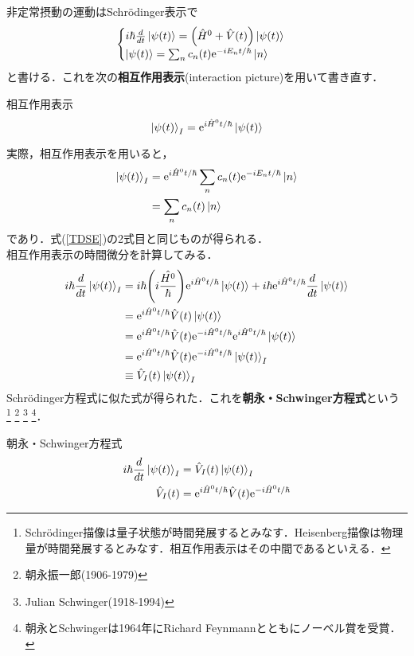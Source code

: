 \documentclass{report}
\begin{document}
  非定常摂動の運動はSchrödinger表示で
  \begin{equation}
    \label{TDSE}
    \begin{cases}
    i\hbar\frac{d}{dt}\ket{\psi(t)}=\qty(\hat{H}^0+\hat{V}(t))\ket{\psi(t)}\\
    \ket{\psi(t)}=\sum_{n}c_n(t)\mathrm{e}^{-iE_nt/\hbar}\ket{n}
    \end{cases}
  \end{equation}
  と書ける．これを次の\textbf{相互作用表示}(interaction picture)を用いて書き直す．
  \begin{itembox}[l]{相互作用表示}
    \begin{equation}
      \ket{\psi(t)}_I=\mathrm{e}^{i\hat{H}^0t/\hbar}\ket{\psi(t)}
    \end{equation}  
  \end{itembox}
  実際，相互作用表示を用いると，
  \begin{align}
    \ket{\psi(t)}_I&=\mathrm{e}^{i\hat{H}^0t/\hbar}\sum_{n}c_n(t)\mathrm{e}^{-iE_nt/\hbar}\ket{n}\\
    &=\sum_{n}c_n(t)\ket{n}
  \end{align}
  であり．式(\ref{TDSE})の2式目と同じものが得られる．\\
  相互作用表示の時間微分を計算してみる．
  \begin{align}
    i\hbar\frac{d}{dt}\ket{\psi(t)}_I&=i\hbar\qty(i\frac{\hat{H^0}}{\hbar})\mathrm{e}^{i\hat{H}^0t/\hbar}\ket{\psi(t)}+i\hbar\mathrm{e}^{i\hat{H}^0t/\hbar}\frac{d}{dt}\ket{\psi(t)}\\
    &=\mathrm{e}^{i\hat{H}^0t/\hbar}\hat{V}(t)\ket{\psi(t)}\\
    &=\mathrm{e}^{i\hat{H}^0t/\hbar}\hat{V}(t)\mathrm{e}^{-i\hat{H}^0t/\hbar}\mathrm{e}^{i\hat{H}^0t/\hbar}\ket{\psi(t)}\\
    &=\mathrm{e}^{i\hat{H}^0t/\hbar}\hat{V}(t)\mathrm{e}^{-i\hat{H}^0t/\hbar}\ket{\psi(t)}_I\\
    &\equiv\hat{V}_I(t)\ket{\psi(t)}_I
  \end{align}
  Schrödinger方程式に似た式が得られた．これを\textbf{朝永・Schwinger方程式}という
  \footnote{Schrödinger描像は量子状態が時間発展するとみなす．Heisenberg描像は物理量が時間発展するとみなす．相互作用表示はその中間であるといえる．}  
  \footnote{朝永振一郎(1906-1979)}
  \footnote{Julian Schwinger(1918-1994)}
  \footnote{朝永とSchwingerは1964年にRichard Feynmannとともにノーベル賞を受賞．}．
  \begin{itembox}[l]{朝永・Schwinger方程式}
    \begin{align}
      \label{Tomonaga}
      i\hbar\frac{d}{dt}\ket{\psi(t)}_I&=\hat{V}_I(t)\ket{\psi(t)}_I\\
      \hat{V}_I(t)&=\mathrm{e}^{i\hat{H}^0t/\hbar}\hat{V}(t)\mathrm{e}^{-i\hat{H}^0t/\hbar}
    \end{align}
  \end{itembox}
\end{document}

